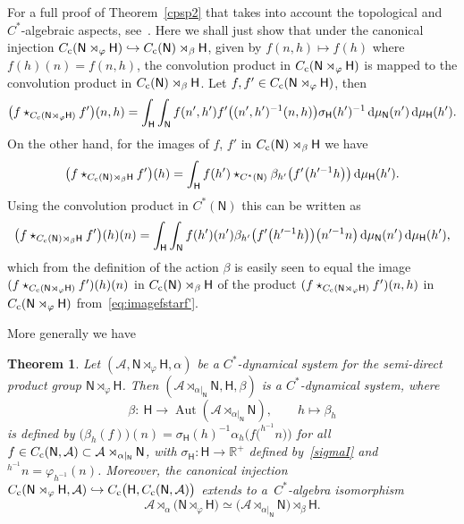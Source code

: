 \documentclass[pdftex]{sigma}
\numberwithin{equation}{section}
\def\dd{{\rm d}}
\newcommand{\sfH}{\mathsf{H}}
\newcommand{\sfN}{\mathsf{N}}
\newcommand{\Aut}{\operatorname{Aut}}
\newcommand{\real}{{\mathbb R}} %
\def\alg{{\mathcal A}}
\newtheorem{Theorem}{Theorem}[section]
\begin{document}
For a full
proof of Theorem~\ref{cpsp2} that takes into account the topological
and $C^*$-algebraic aspects, see~\cite[Proposition~3.11]{Williams2007}. Here
we shall just show that under the canonical injection $C_{\rm c}(\sfN \rtimes_\varphi \sfH )\hookrightarrow
C_{\rm c}(\sfN )\rtimes_\beta \sfH $, given by $f(n,h)\mapsto f(h)$ where
$f(h)(n)=f(n,h)$, the convolution product in $C_{\rm c}(\sfN \rtimes_\varphi
\sfH )$ is mapped to the convolution product in $C_{\rm c}(\sfN )\rtimes_\beta \sfH $.
Let $f,f'\in C_{\rm c}(\sfN \rtimes_\varphi \sfH )$, then
\begin{gather}\label{eq:imagefstarf'}
\big(f\star_{C_{\rm c}(\sfN \rtimes_\varphi
 \sfH )}f'\big)(n,h)=\int_\sfH \int_\sfN f(n',h')
f'\big((n',h')^{-1} (n,h)\big) \sigma_\sfH(h')^{-1} \, \dd\mu_\sfN (n') \, \dd\mu_\sfH (h').
\end{gather}
On the other hand, for the images of $f$, $f'$ in $C_{\rm c}(\sfN
)\rtimes_\beta \sfH $ we have
\[
\big(f\star_{C_{\rm c}(\sfN )\rtimes_\beta
 \sfH }f'\big)(h)=\int_\sfH f(h')\star_{C^*(\sfN
 )}\beta_{h'}\big(f'\big(h'^{-1} h\big)\big) \, \dd\mu_\sfH (h') .
\]
Using the convolution product in $C^*(\sfN)$ this can be written as
\begin{align*}
\big(f\star_{C_{\rm c}(\sfN )\rtimes_\beta
 \sfH }f'\big)(h)(n)=\int_\sfH \int_\sfN
 f(h')(n') \beta_{h'}\big(f'\big(h'^{-1} h\big)\big)\big(n'^{-1} n\big)
\, \dd\mu_\sfN (n') \, \dd\mu_\sfH (h') ,
\end{align*}
which from the definition of the action $\beta$ is easily seen to
equal the image $(f\star_{C_{\rm c}(\sfN \rtimes_\varphi \sfH
 )}f')(h)(n)$ in $C_{\rm c}(\sfN )\rtimes_\beta
 \sfH $ of the product $(f\star_{C_{\rm c}(\sfN \rtimes_\varphi
 \sfH )}f')(n,h)$ in $C_{\rm c}(\sfN \rtimes_\varphi
\sfH )$ from~\eqref{eq:imagefstarf'}.

More generally we have~\cite[Proposition~3.11]{Williams2007}
\begin{Theorem}\label{cpsp3}
Let $(\alg,\sfN \rtimes_\varphi \sfH ,\alpha)$ be a $C^*$-dynamical
system for the semi-direct product group $\sfN \rtimes_\varphi \sfH $. Then $(\alg\rtimes_{\alpha|_\sfN }\sfN ,\sfH ,\beta)$ is a $C^*$-dynamical
system, where
\[
\beta\colon \ \sfH \longrightarrow \Aut(\alg\rtimes_{\alpha|_\sfN }\sfN ) ,
\qquad h\longmapsto \beta_h
\]
is defined by
$\big(\beta_h(f)\big)(n)=\sigma_\sfH(h)^{-1} \alpha_h\big(f\big(^{h^{-1\!}}n\big)\big)$
for all $f\in C_{\rm c}(\sfN ,\alg)\subset \alg\rtimes_{\alpha|_\sfN }\sfN $, with $\sigma_\sfH\colon
\sfH \to \real^+$ defined by~\eqref{sigmaI} and $^{h^{-1\!}}n=\varphi_{h^{-1}}(n)$.
Moreover, the canonical injection $C_{\rm c}(\sfN \rtimes_\varphi \sfH ,\alg)\hookrightarrow
C_{\rm c}\big(\sfH ,C_{\rm c}(\sfN ,\alg)\big)$
extends to a~$C^*$-algebra isomorphism
\[
\alg\rtimes_{\alpha}\big(\sfN \rtimes_\varphi
\sfH \big) \simeq \big(\alg\rtimes_{\alpha|_\sfN } \sfN
\big)\rtimes_\beta \sfH .
\]
\end{Theorem}
\end{document}

